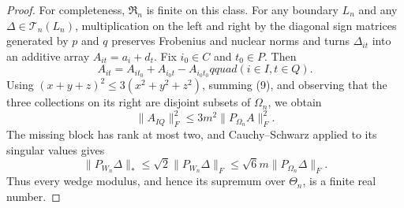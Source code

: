 \documentclass{article}
\begin{document}
\begin{proof}
For completeness, \(\mathfrak R_n\) is finite on this class.  For any boundary \(L_n\) and any \(\Delta\in\mathcal T_n(L_n)\), multiplication on the left and right by the diagonal sign matrices generated by \(p\) and \(q\) preserves Frobenius and nuclear norms and turns \(\Delta_{it}\) into an additive array \(A_{it}=a_i+d_t\).  Fix \(i_0\in C\) and \(t_0\in P\).  Then
\[
A_{it}=A_{i t_0}+A_{i_0t}-A_{i_0t_0}qquad(i\in I, t\in Q).       \tag{9}
\]
Using \((x+y+z)^2\le3(x^2+y^2+z^2)\), summing (9), and observing that the three collections on its right are disjoint subsets of \(\Omega_n\), we obtain
\[
\lVert A_{I Q}\rVert_F^2
\le3m^2\lVert P_{\Omega_n}A\rVert_F^2.                \tag{10}
\]
The missing block has rank at most two, and Cauchy--Schwarz applied to its singular values gives
\[
\lVert P_{W_n}\Delta\rVert_*
\le\sqrt2\lVert P_{W_n}\Delta\rVert_F
\le\sqrt6m\lVert P_{\Omega_n}\Delta\rVert_F.         \tag{11}
\]
Thus every wedge modulus, and hence its supremum over \(\Theta_n\), is a finite real number.


\end{proof}
\end{document}

